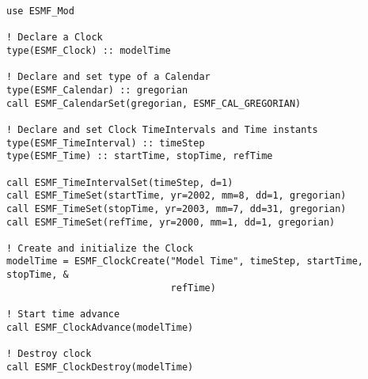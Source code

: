 
\begin{verbatim}
use ESMF_Mod

! Declare a Clock
type(ESMF_Clock) :: modelTime

! Declare and set type of a Calendar
type(ESMF_Calendar) :: gregorian
call ESMF_CalendarSet(gregorian, ESMF_CAL_GREGORIAN)

! Declare and set Clock TimeIntervals and Time instants
type(ESMF_TimeInterval) :: timeStep
type(ESMF_Time) :: startTime, stopTime, refTime

call ESMF_TimeIntervalSet(timeStep, d=1)
call ESMF_TimeSet(startTime, yr=2002, mm=8, dd=1, gregorian)
call ESMF_TimeSet(stopTime, yr=2003, mm=7, dd=31, gregorian)
call ESMF_TimeSet(refTime, yr=2000, mm=1, dd=1, gregorian)

! Create and initialize the Clock
modelTime = ESMF_ClockCreate("Model Time", timeStep, startTime, stopTime, &
                             refTime)

! Start time advance
call ESMF_ClockAdvance(modelTime)

! Destroy clock
call ESMF_ClockDestroy(modelTime)
\end{verbatim}
